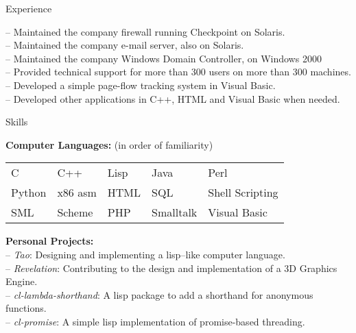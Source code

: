 \documentclass[letterpaper, 11pt]{article}
\begin{document}
\begin{resume}
\begin{category}{Experience}
\begin{block}
                -- Maintained the company firewall running Checkpoint on Solaris.                   \\
                -- Maintained the company e-mail server, also on Solaris.                           \\
                -- Maintained the company Windows Domain Controller, on Windows 2000                \\
                -- Provided technical support for more than 300 users on more than 300 machines.    \\
                -- Developed a simple page-flow tracking system in Visual Basic.                    \\
                -- Developed other applications in C++, HTML and Visual Basic when needed.
            \end{block}
        \end{category}
        \begin{category}{Skills}
            \begin{block}
                \textbf{Computer Languages:} (in order of familiarity)                                  \\
                \begin{tabular}{@{} l l l l l @{}}
                    C           &   C++         &   Lisp        &   Java        &   Perl                \\
                    Python      &   x86 asm     &   HTML        &   SQL         &   Shell Scripting     \\
                    SML         &   Scheme      &   PHP         &   Smalltalk   &   Visual Basic
                \end{tabular}
            \end{block}
            \begin{block}
                \textbf{Personal Projects:}                                                                     \\
                -- \emph{Tao}: Designing and implementing a lisp--like computer language.                       \\
                -- \emph{Revelation}: Contributing to the design and implementation of a 3D Graphics Engine.    \\
                -- \emph{cl-lambda-shorthand}: A lisp package to add a shorthand for anonymous functions.       \\
                -- \emph{cl-promise}: A simple lisp implementation of promise-based threading.                  \\

\end{block}
\end{category}
\end{resume}
\end{document}
